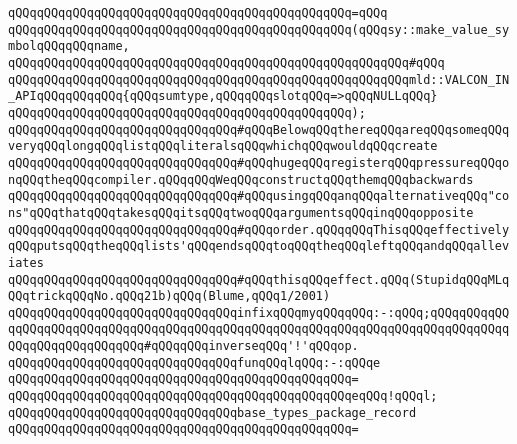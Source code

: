 \verb|qQQqqQQqqQQqqQQqqQQqqQQqqQQqqQQqqQQqqQQqqQQqqQQq=qQQq|\newline
\verb|qQQqqQQqqQQqqQQqqQQqqQQqqQQqqQQqqQQqqQQqqQQqqQQq(qQQqsy::make_value_symbolqQQqqQQqname,|\newline
\verb|qQQqqQQqqQQqqQQqqQQqqQQqqQQqqQQqqQQqqQQqqQQqqQQqqQQqqQQq#qQQq|\newline
\verb|qQQqqQQqqQQqqQQqqQQqqQQqqQQqqQQqqQQqqQQqqQQqqQQqqQQqqQQqmld::VALCON_IN_APIqQQqqQQqqQQq{qQQqsumtype,qQQqqQQqslotqQQq=>qQQqNULLqQQq}|\newline
\verb|qQQqqQQqqQQqqQQqqQQqqQQqqQQqqQQqqQQqqQQqqQQqqQQq);|\newline
\newline
\verb|qQQqqQQqqQQqqQQqqQQqqQQqqQQqqQQq#qQQqBelowqQQqthereqQQqareqQQqsomeqQQqveryqQQqlongqQQqlistqQQqliteralsqQQqwhichqQQqwouldqQQqcreate|\newline
\verb|qQQqqQQqqQQqqQQqqQQqqQQqqQQqqQQq#qQQqhugeqQQqregisterqQQqpressureqQQqonqQQqtheqQQqcompiler.qQQqqQQqWeqQQqconstructqQQqthemqQQqbackwards|\newline
\verb|qQQqqQQqqQQqqQQqqQQqqQQqqQQqqQQq#qQQqusingqQQqanqQQqalternativeqQQq"cons"qQQqthatqQQqtakesqQQqitsqQQqtwoqQQqargumentsqQQqinqQQqopposite|\newline
\verb|qQQqqQQqqQQqqQQqqQQqqQQqqQQqqQQq#qQQqorder.qQQqqQQqThisqQQqeffectivelyqQQqputsqQQqtheqQQqlists'qQQqendsqQQqtoqQQqtheqQQqleftqQQqandqQQqalleviates|\newline
\verb|qQQqqQQqqQQqqQQqqQQqqQQqqQQqqQQq#qQQqthisqQQqeffect.qQQq(StupidqQQqMLqQQqtrickqQQqNo.qQQq21b)qQQq(Blume,qQQq1/2001)|\newline
\newline
\verb|qQQqqQQqqQQqqQQqqQQqqQQqqQQqqQQqinfixqQQqmyqQQqqQQq:-:qQQq;qQQqqQQqqQQqqQQqqQQqqQQqqQQqqQQqqQQqqQQqqQQqqQQqqQQqqQQqqQQqqQQqqQQqqQQqqQQqqQQqqQQqqQQqqQQqqQQqqQQq#qQQqqQQqinverseqQQq'!'qQQqop.|\newline
\newline
\verb|qQQqqQQqqQQqqQQqqQQqqQQqqQQqqQQqfunqQQqlqQQq:-:qQQqe|\newline
\verb|qQQqqQQqqQQqqQQqqQQqqQQqqQQqqQQqqQQqqQQqqQQqqQQq=|\newline
\verb|qQQqqQQqqQQqqQQqqQQqqQQqqQQqqQQqqQQqqQQqqQQqqQQqeqQQq!qQQql;|\newline
\newline
\newline
\verb|qQQqqQQqqQQqqQQqqQQqqQQqqQQqqQQqbase_types_package_record|\newline
\verb|qQQqqQQqqQQqqQQqqQQqqQQqqQQqqQQqqQQqqQQqqQQqqQQq=|\newline
